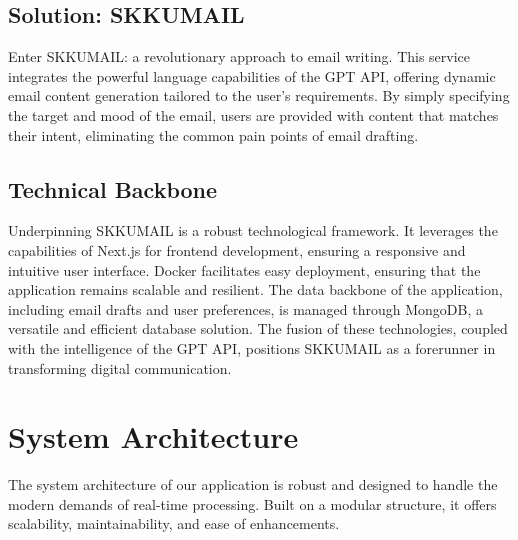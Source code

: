 \documentclass[12pt]{article}
\begin{document}
\subsection{Solution: SKKUMAIL}

Enter SKKUMAIL: a revolutionary approach to email writing. This service integrates the powerful language capabilities of the GPT API, offering dynamic email content generation tailored to the user's requirements. By simply specifying the target and mood of the email, users are provided with content that matches their intent, eliminating the common pain points of email drafting.

\subsection{Technical Backbone}

Underpinning SKKUMAIL is a robust technological framework. It leverages the capabilities of Next.js for frontend development, ensuring a responsive and intuitive user interface. Docker facilitates easy deployment, ensuring that the application remains scalable and resilient. The data backbone of the application, including email drafts and user preferences, is managed through MongoDB, a versatile and efficient database solution. The fusion of these technologies, coupled with the intelligence of the GPT API, positions SKKUMAIL as a forerunner in transforming digital communication.


\section{System Architecture}

The system architecture of our application is robust and designed to handle the modern demands of real-time processing. Built on a modular structure, it offers scalability, maintainability, and ease of enhancements.
\end{document}
